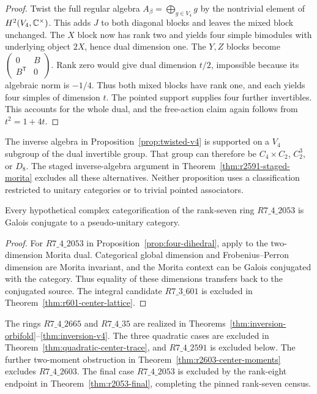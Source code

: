 \begin{proof}
Twist the full regular algebra $A_\beta=\bigoplus_{g\in V_4}g$
by the nontrivial element of $H^2(V_4,\mathbb C^\times)$. This adds $J$
to both diagonal blocks and leaves the mixed block unchanged.
The $X$ block now has rank two and yields four simple bimodules
with underlying object $2X$, hence dual dimension one.
The $Y,Z$ blocks become
$\left(\begin{smallmatrix}0&B\\B^{\mathsf T}&0\end{smallmatrix}\right)$.
Rank zero would give dual dimension $t/2$, impossible because its
algebraic norm is $-1/4$. Thus both mixed blocks have rank one,
and each yields four simples of dimension $t$.
The pointed support supplies four further invertibles. This accounts
for the whole dual, and the free-action claim again follows from
$t^2=1+4t$.
\end{proof}

The inverse algebra in Proposition~\ref{prop:twisted-v4} is supported
on a $V_4$ subgroup of the dual invertible group. That group can therefore
be $C_4\times C_2$, $C_2^3$, or $D_8$. The staged inverse-algebra argument in
Theorem~\ref{thm:r2591-staged-morita} excludes all these alternatives.
Neither proposition uses a classification restricted to unitary
categories or to trivial pointed associators.

\begin{corollary}\label{cor:all-nine-galois}
Every hypothetical complex categorification of the
rank-seven ring $R7\_4\_2053$ is Galois conjugate to a pseudo-unitary
category.
\end{corollary}
\begin{proof}
For $R7\_4\_2053$ in Proposition~\ref{prop:four-dihedral}, apply
\cite[Lemma~3.1]{Schopieray} to the two-dimension Morita dual.
Categorical global dimension and Frobenius--Perron dimension are Morita
invariant, and the Morita context can be Galois conjugated with the
category. Thus equality of these dimensions transfers back to the
conjugated source. The integral candidate $R7\_3\_601$ is excluded
in Theorem~\ref{thm:r601-center-lattice}.
\end{proof}

The rings $R7\_4\_2665$ and $R7\_4\_35$ are realized in
Theorems~\ref{thm:inversion-orbifold}--\ref{thm:inversion-v4}.
The three quadratic cases are excluded in
Theorem~\ref{thm:quadratic-center-trace}, and $R7\_4\_2591$ is
excluded below. The further two-moment obstruction in
Theorem~\ref{thm:r2603-center-moments} excludes $R7\_4\_2603$.
The final case $R7\_4\_2053$ is excluded by the rank-eight endpoint
in Theorem~\ref{thm:r2053-final}, completing the pinned rank-seven census.
